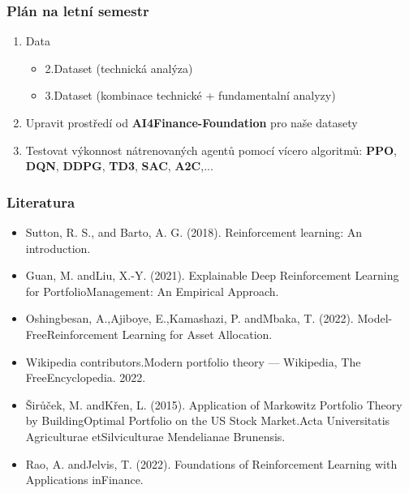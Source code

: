 \begin{frame}
    \frametitle{Plán na letní semestr}
    \begin{enumerate}
        \itemsep1em
        \item Data
        \begin{itemize}
            \itemsep1em
            \item 2.Dataset (technická analýza)
            \item 3.Dataset (kombinace technické + fundamentalní analyzy)
        \end{itemize}
        \item Upravit prostředí od \textbf{AI4Finance-Foundation} pro naše datasety
        \item Testovat výkonnost nátrenovaných agentů pomocí vícero algoritmů:
        \textbf{PPO}, \textbf{DQN}, \textbf{DDPG}, \textbf{TD3}, \textbf{SAC}, \textbf{A2C},...
    \end{enumerate}
\end{frame}


\begin{frame}
    \frametitle{Literatura}
    {
        \fontsize{7}{15}\selectfont

        \begin{itemize}
            \item Sutton, R. S., and Barto, A. G. (2018). Reinforcement learning: An introduction.
            \item Guan, M. andLiu, X.-Y. (2021). Explainable Deep Reinforcement Learning for PortfolioManagement: An Empirical Approach.
            \item Oshingbesan, A.,Ajiboye, E.,Kamashazi, P. andMbaka, T. (2022). Model-FreeReinforcement Learning for Asset Allocation.
            \item Wikipedia contributors.Modern portfolio theory — Wikipedia, The FreeEncyclopedia. 2022.
            \item Širůček, M. andKřen, L. (2015). Application of Markowitz Portfolio Theory by BuildingOptimal Portfolio on the US Stock Market.Acta Universitatis Agriculturae etSilviculturae Mendelianae Brunensis.
            \item Rao, A. andJelvis, T. (2022). Foundations of Reinforcement Learning with Applications inFinance.
        \end{itemize}
    }
\end{frame}


